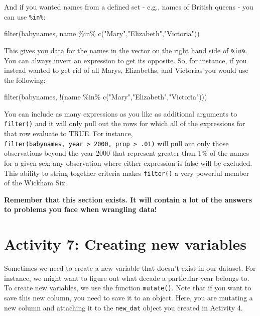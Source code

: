 \documentclass[
  oneside]{book}
\newenvironment{Shaded}{\begin{snugshade}}{\end{snugshade}}
\newcommand{\FunctionTok}[1]{\textcolor[rgb]{0.00,0.00,0.00}{#1}}
\newcommand{\NormalTok}[1]{#1}
\newcommand{\SpecialCharTok}[1]{\textcolor[rgb]{0.00,0.00,0.00}{#1}}
\newcommand{\StringTok}[1]{\textcolor[rgb]{0.31,0.60,0.02}{#1}}
\begin{document}
And if you wanted names from a defined set - e.g., names of British queens - you can use \texttt{\%in\%}:

\begin{Shaded}
\begin{Highlighting}[]
\FunctionTok{filter}\NormalTok{(babynames, name }\SpecialCharTok{\%in\%} \FunctionTok{c}\NormalTok{(}\StringTok{"Mary"}\NormalTok{,}\StringTok{"Elizabeth"}\NormalTok{,}\StringTok{"Victoria"}\NormalTok{))}
\end{Highlighting}
\end{Shaded}

This gives you data for the names in the vector on the right hand side of \texttt{\%in\%}. You can always invert an expression to get its opposite. So, for instance, if you instead wanted to get rid of all Marys, Elizabeths, and Victorias you would use the following:

\begin{Shaded}
\begin{Highlighting}[]
\FunctionTok{filter}\NormalTok{(babynames, }\SpecialCharTok{!}\NormalTok{(name }\SpecialCharTok{\%in\%} \FunctionTok{c}\NormalTok{(}\StringTok{"Mary"}\NormalTok{,}\StringTok{"Elizabeth"}\NormalTok{,}\StringTok{"Victoria"}\NormalTok{)))}
\end{Highlighting}
\end{Shaded}

You can include as many expressions as you like as additional arguments to \texttt{filter()} and it will only pull out the rows for which all of the expressions for that row evaluate to TRUE. For instance, \texttt{filter(babynames,\ year\ \textgreater{}\ 2000,\ prop\ \textgreater{}\ .01)} will pull out only those observations beyond the year 2000 that represent greater than 1\% of the names for a given sex; any observation where either expression is false will be excluded. This ability to string together criteria makes \texttt{filter()} a very powerful member of the Wickham Six.

\textbf{Remember that this section exists. It will contain a lot of the answers to problems you face when wrangling data!}

\hypertarget{activity-7-creating-new-variables}{%
\section{Activity 7: Creating new variables}\label{activity-7-creating-new-variables}}

Sometimes we need to create a new variable that doesn't exist in our dataset. For instance, we might want to figure out what decade a particular year belongs to. To create new variables, we use the function \texttt{mutate()}. Note that if you want to save this new column, you need to save it to an object. Here, you are mutating a new column and attaching it to the \texttt{new\_dat} object you created in Activity 4.
\end{document}
